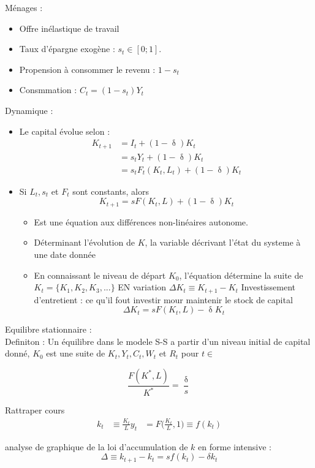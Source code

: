 \documentclass{article}
\begin{document}
Ménages :
\begin{itemize}
	\item Offre inélastique de travail
	\item Taux d'épargne exogène : \(s_t \in [0;1]\).
	\item Propension à consommer le revenu : \(1 - s_t\)
	\item Consmmation : \(C_t = (1-s_t) Y_t\)
\end{itemize}
Dynamique : 
\begin{itemize}
	\item Le capital évolue selon : 
	\begin{align*}
		K_{t+1} &= I_t + (1- \updelta) K_t \\
		&= s_t Y_t + (1 - \updelta) K_t \\
		&= s_t F_t (K_t, L_t) + (1- \updelta) K_t
	\end{align*}
	\item Si \(L_t, s_t\) et \(F_t\) sont constants, alors
	\[K_{t+1} = s F(K_t, L) + (1- \updelta) K_t\]
	\begin{itemize}
		\item Est une équation aux différences non-linéaires autonome.
		\item Déterminant l'évolution de \(K\), la variable décrivant l'état du systeme à une date donnée
		\item En connaissant le niveau de départ \(K_0\), l'équation détermine la suite de \(K_t = \{K_1, K_2,K_3,...\}\)
		EN variation \(\Delta K_t \equiv K_{t+1} - K_t\)
		Investissement d'entretient : ce qu'il fout investir mour maintenir le stock de capital
		\[\Delta K_t = s F (K_t, L) - \updelta K_t\]
	\end{itemize}	 
\end{itemize}
Equilibre stationnaire :  \\
Definiton : Un équilibre dans le modele S-S a partir d'un niveau initial de capital donné, \(K_0\) est une suite de \(K_t , Y_t, C_t, W_t\) et \(R_t\) pour \(t \in \)

\[\frac{F (K^* , L)}{K^*} = \frac{\updelta}{s}\]

Rattraper cours  \\

\begin{align*}
	k_t &\equiv \frac{K_t}{L}
	y_t &= F \Big( \frac{K_t}{L} , 1) \equiv f(k_t)
\end{align*}

analyse de graphique de la loi d'accumulation de \(k\) en forme intensive : 
\[\Delta \equiv k_{t+1} - k_t = sf(k_t) - \delta k_t\]
\end{document}
